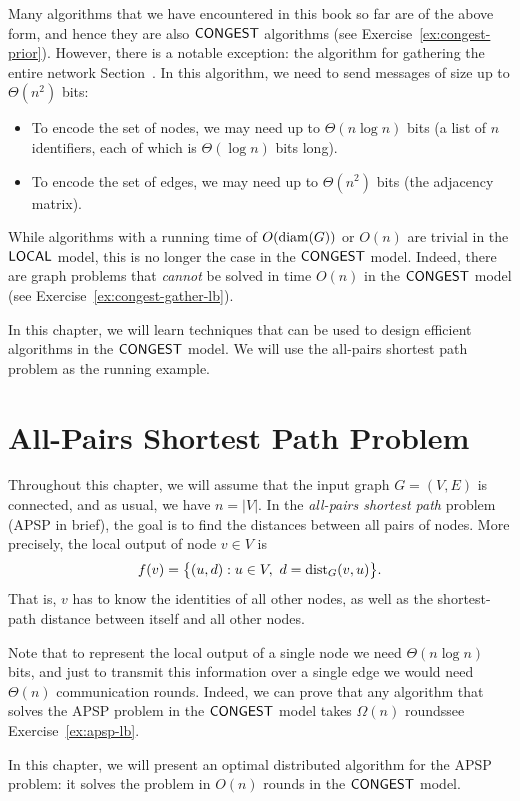 Many algorithms that we have encountered in this book so far are of the above form, and hence they are also $\textup{\sffamily CONGEST}$ algorithms (see Exercise~\ref{ex:congest-prior}). However, there is a notable exception: the algorithm for gathering the entire network Section~. In this algorithm, we need to send messages of size up to $\Theta(n^2)$ bits:
\begin{itemize}
    \item To encode the set of nodes, we may need up to $\Theta(n \log n)$ bits (a list of $n$ identifiers, each of which is $\Theta(\log n)$ bits long).
    \item To encode the set of edges, we may need up to $\Theta(n^2)$ bits (the adjacency matrix).
\end{itemize}

While algorithms with a running time of $O(\operatorname{diam}(G))$ or $O(n)$ are trivial in the $\textup{\sffamily LOCAL}$ model, this is no longer the case in the $\textup{\sffamily CONGEST}$ model. Indeed, there are graph problems that \emph{cannot} be solved in time $O(n)$ in the $\textup{\sffamily CONGEST}$ model (see Exercise~\ref{ex:congest-gather-lb}).

In this chapter, we will learn techniques that can be used to design efficient algorithms in the $\textup{\sffamily CONGEST}$ model. We will use the all-pairs shortest path problem as the running example.


\section{All-Pairs Shortest Path Problem}

Throughout this chapter, we will assume that the input graph $G = (V,E)$ is connected, and as usual, we have $n = |V|$. In the \emph{all-pairs shortest path} problem (APSP in brief), the goal is to find the distances between all pairs of nodes. More precisely, the local output of node $v \in V$ is
\[
    f(v) = \bigl\{ (u, d) : u \in V,\ d = \operatorname{dist}_G(v, u) \bigr\}.
\]
That is, $v$ has to know the identities of all other nodes, as well as the shortest-path distance between itself and all other nodes.

Note that to represent the local output of a single node we need $\Theta(n \log n)$ bits, and just to transmit this information over a single edge we would need $\Theta(n)$ communication rounds. Indeed, we can prove that any algorithm that solves the APSP problem in the $\textup{\sffamily CONGEST}$ model takes $\Omega(n)$ rounds\mydash see Exercise~\ref{ex:apsp-lb}.

In this chapter, we will present an optimal distributed algorithm for the APSP problem: it solves the problem in $O(n)$ rounds in the $\textup{\sffamily CONGEST}$ model.

